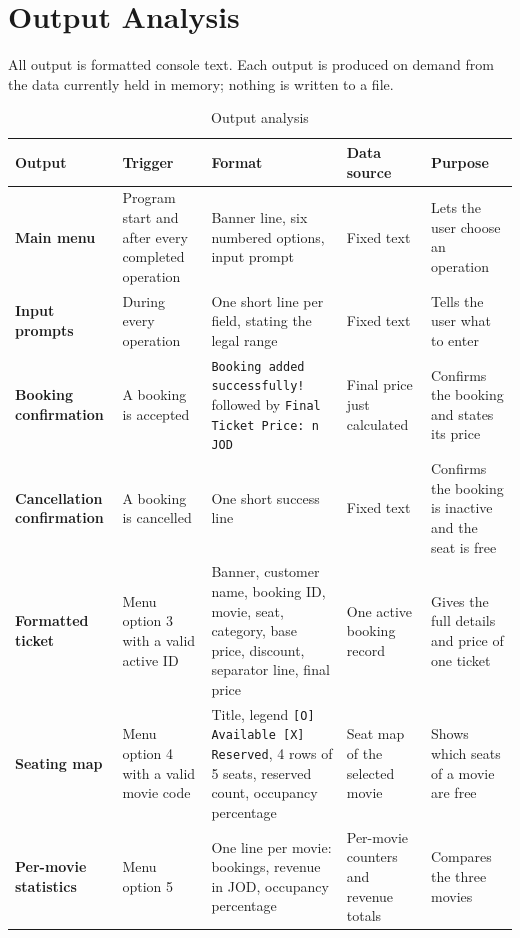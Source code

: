 \documentclass{thesis-library}
\newcommand{\tablefont}{\footnotesize\setstretch{1.15}\hyphenpenalty=10000\relax}
\begin{document}
\section{Output Analysis}

All output is formatted console text. Each output is produced on demand from the data currently held in memory; nothing is written to a file.

\begin{table}[htbp]
\centering
\tablefont
\caption{Output analysis}
\label{tab:output}
\begin{tabular}{|>{\raggedright\arraybackslash}p{2.2cm}|>{\raggedright\arraybackslash}p{2.6cm}|>{\raggedright\arraybackslash}p{4.0cm}|>{\raggedright\arraybackslash}p{2.2cm}|>{\raggedright\arraybackslash}p{2.8cm}|}
\hline
\textbf{Output} & \textbf{Trigger} & \textbf{Format} & \textbf{Data source} & \textbf{Purpose} \\
\hline
\textbf{Main menu} & Program start and after every completed operation & Banner line, six numbered options, input prompt & Fixed text & Lets the user choose an operation \\
\hline
\textbf{Input prompts} & During every operation & One short line per field, stating the legal range & Fixed text & Tells the user what to enter \\
\hline
\textbf{Booking confirmation} & A booking is accepted & \texttt{Booking added successfully!} followed by \texttt{Final Ticket Price: n JOD} & Final price just calculated & Confirms the booking and states its price \\
\hline
\textbf{Cancellation confirmation} & A booking is cancelled & One short success line & Fixed text & Confirms the booking is inactive and the seat is free \\
\hline
\textbf{Formatted ticket} & Menu option 3 with a valid active ID & Banner, customer name, booking ID, movie, seat, category, base price, discount, separator line, final price & One active booking record & Gives the full details and price of one ticket \\
\hline
\textbf{Seating map} & Menu option 4 with a valid movie code & Title, legend \texttt{[O] Available [X] Reserved}, 4 rows of 5 seats, reserved count, occupancy percentage & Seat map of the selected movie & Shows which seats of a movie are free \\
\hline
\textbf{Per-movie statistics} & Menu option 5 & One line per movie: bookings, revenue in JOD, occupancy percentage & Per-movie counters and revenue totals & Compares the three movies \\

\end{tabular}
\end{table}
\end{document}
